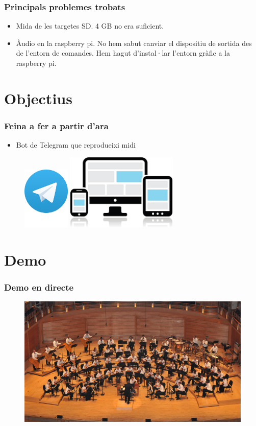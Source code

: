 \documentclass{beamer}
\begin{document}
\begin{frame}
	\frametitle{Principals problemes trobats}
	\begin{itemize}
		\item Mida de les targetes SD. 4 GB no era suficient.
		\item Àudio en la raspberry pi. No hem sabut canviar el dispositiu de sortida des de l'entorn de comandes. Hem hagut d'instal·lar l'entorn gràfic a la raspberry pi.
	\end{itemize}
\end{frame}

\section{Objectius}
\begin{frame}
	\frametitle{Feina a fer a partir d'ara}
	\begin{itemize}
		\item Bot de Telegram que reprodueixi midi
	\end{itemize}
	\begin{figure}
		\hfill
		\includegraphics[width=0.2\textwidth]{images/telegram}
		\hfill
		\includegraphics[width=0.475\textwidth]{images/mobile}
		\hfill
	\end{figure}
\end{frame}

\section{Demo}
\begin{frame}
	\frametitle{Demo en directe}
	\begin{figure}
		\includegraphics[width=\linewidth]{images/orchestra}
	\end{figure}
\end{frame}
\end{document}
